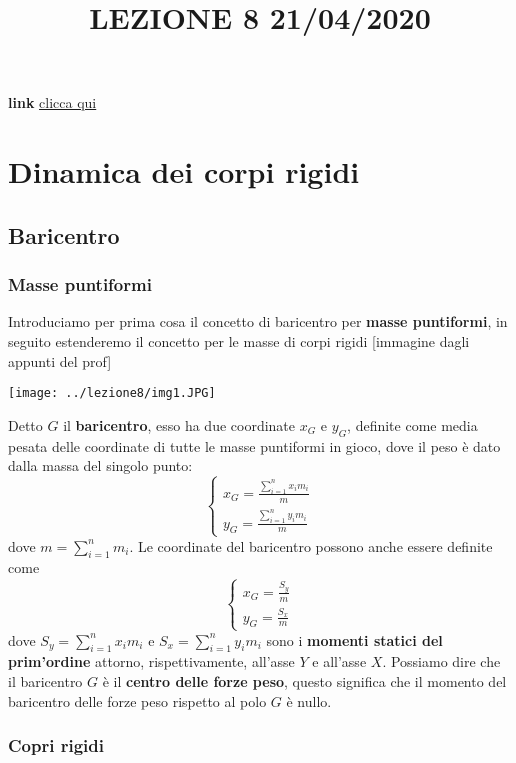 \title{LEZIONE 8 21/04/2020}\newline
\textbf{link} \href{https://web.microsoftstream.com/video/daf8e418-03bf-40c5-8093-3391c41375be}{clicca qui}
\section{Dinamica dei corpi rigidi}
\subsection{Baricentro}
\subsubsection{Masse puntiformi}
Introduciamo per prima cosa il concetto di baricentro per \textbf{masse puntiformi}, in seguito estenderemo il concetto per le masse di corpi rigidi
[immagine dagli appunti del prof]
\begin{center}
    \texttt{[image: ../lezione8/img1.JPG]}
\end{center}
Detto $G$ il \textbf{baricentro}, esso ha due coordinate $x_G$ e $y_G$, definite come media pesata delle coordinate di tutte le masse puntiformi in gioco, dove il peso è dato dalla massa del singolo punto:
\[
    \begin{cases}
        x_G = \frac{\sum_{i=1}^{n} x_i m_i}{m}\\
        y_G = \frac{\sum_{i=1}^{n} y_i m_i}{m}
    \end{cases}
\]
dove $m = \sum_{i=1}^{n} m_i$.\newline
\newline
Le coordinate del baricentro possono anche essere definite come
\[
    \begin{cases}
        x_G = \frac{S_y}{m}\\
        y_G = \frac{S_x}{m}
    \end{cases}
\]
dove $S_y = \sum_{i=1}^{n} x_i m_i$ e $S_x = \sum_{i=1}^{n} y_i m_i$ sono i \textbf{momenti statici del prim'ordine} attorno, rispettivamente, all'asse $Y$ e all'asse $X$.\newline
\newline
Possiamo dire che  il baricentro $G$ è il \textbf{centro delle forze peso}, questo significa che il momento del baricentro delle forze peso rispetto al polo $G$ è nullo.\subsubsection{Copri rigidi}

